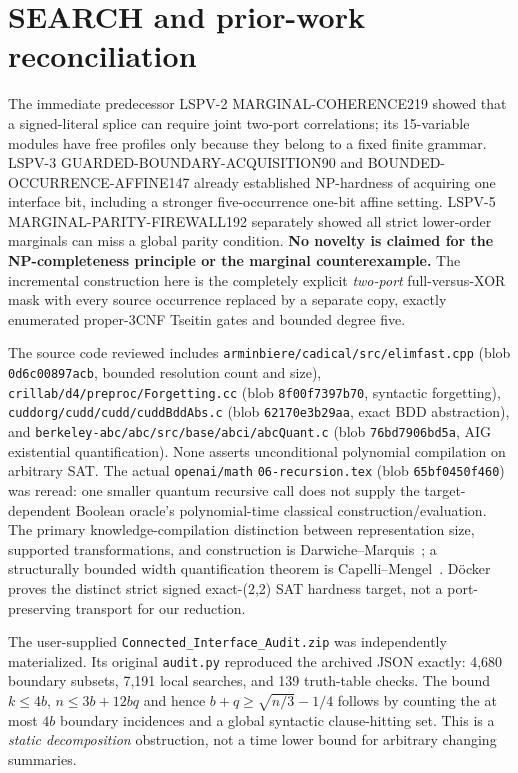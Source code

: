 \documentclass[11pt]{article}
\begin{document}
\section{SEARCH and prior-work reconciliation}
The immediate predecessor LSPV-2 MARGINAL-COHERENCE219 showed that a signed-literal splice can require joint two-port correlations; its 15-variable modules have free profiles only because they belong to a fixed finite grammar. LSPV-3 GUARDED-BOUNDARY-ACQUISITION90 and BOUNDED-OCCURRENCE-AFFINE147 already established NP-hardness of acquiring one interface bit, including a stronger five-occurrence one-bit affine setting. LSPV-5 MARGINAL-PARITY-FIREWALL192 separately showed all strict lower-order marginals can miss a global parity condition. \textbf{No novelty is claimed for the NP-completeness principle or the marginal counterexample.} The incremental construction here is the completely explicit \emph{two-port} full-versus-XOR mask with every source occurrence replaced by a separate copy, exactly enumerated proper-3CNF Tseitin gates and bounded degree five.

The source code reviewed includes \texttt{arminbiere/cadical/src/elimfast.cpp} (blob \texttt{0d6c00897acb}, bounded resolution count and size), \texttt{crillab/d4/preproc/Forgetting.cc} (blob \texttt{8f00f7397b70}, syntactic forgetting), \texttt{cuddorg/cudd/cudd/cuddBddAbs.c} (blob \texttt{62170e3b29aa}, exact BDD abstraction), and \texttt{berkeley-abc/abc/src/base/abci/abcQuant.c} (blob \texttt{76bd7906bd5a}, AIG existential quantification). None asserts unconditional polynomial compilation on arbitrary SAT. The actual \texttt{openai/math} \texttt{06-recursion.tex} (blob \texttt{65bf0450f460}) was reread: one smaller quantum recursive call does not supply the target-dependent Boolean oracle's polynomial-time classical construction/evaluation. The primary knowledge-compilation distinction between representation size, supported transformations, and construction is Darwiche--Marquis~\cite{DM}; a structurally bounded width quantification theorem is Capelli--Mengel~\cite{CM}. D\"ocker~\cite{D} proves the distinct strict signed exact-(2,2) SAT hardness target, not a port-preserving transport for our reduction.

The user-supplied \texttt{Connected\_Interface\_Audit.zip} was independently materialized. Its original \texttt{audit.py} reproduced the archived JSON exactly: 4,680 boundary subsets, 7,191 local searches, and 139 truth-table checks. The bound $k\le4b$, $n\le3b+12bq$ and hence $b+q\ge\sqrt{n/3}-1/4$ follows by counting the at most $4b$ boundary incidences and a global syntactic clause-hitting set. This is a \emph{static decomposition} obstruction, not a time lower bound for arbitrary changing summaries.
\end{document}

